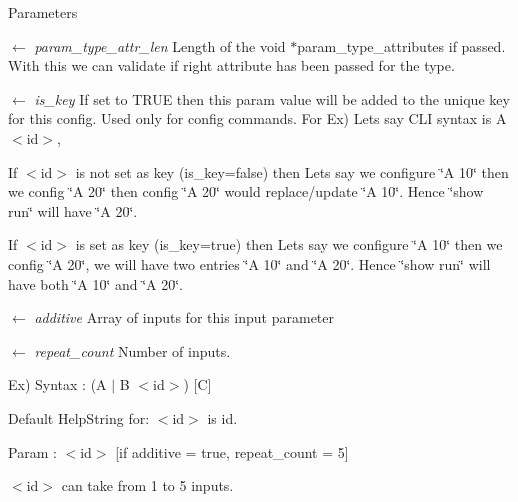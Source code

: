 \begin{DoxyParams}{Parameters}
\item[\mbox{$\leftarrow$} {\em param\_\-type\_\-attr\_\-len}]Length of the void $\ast$param\_\-type\_\-attributes if passed. With this we can validate if right attribute has been passed for the type. \item[\mbox{$\leftarrow$} {\em is\_\-key}]If set to TRUE then this param value will be added to the unique key for this config. Used only for config commands. For Ex) Lets say CLI syntax is A $<$id$>$,
\begin{DoxyItemize}
\item If $<$id$>$ is not set as key (is\_\-key=false) then Lets say we configure \char`\"{}A 10\char`\"{} then we config \char`\"{}A 20\char`\"{} then config \char`\"{}A 20\char`\"{} would replace/update \char`\"{}A 10\char`\"{}. Hence \char`\"{}show run\char`\"{} will have \char`\"{}A 20\char`\"{}.
\item If $<$id$>$ is set as key (is\_\-key=true) then Lets say we configure \char`\"{}A 10\char`\"{} then we config \char`\"{}A 20\char`\"{}, we will have two entries \char`\"{}A 10\char`\"{} and \char`\"{}A 20\char`\"{}. Hence \char`\"{}show run\char`\"{} will have both \char`\"{}A 10\char`\"{} and \char`\"{}A 20\char`\"{}. 
\end{DoxyItemize}\item[\mbox{$\leftarrow$} {\em additive}]Array of inputs for this input parameter \item[\mbox{$\leftarrow$} {\em repeat\_\-count}]Number of inputs. \par
 Ex) Syntax : (A $|$ B $<$id$>$) \mbox{[}C\mbox{]} \par
 Default HelpString for: $<$id$>$ is id. \par
 Param : $<$id$>$ \mbox{[}if additive = true, repeat\_\-count = 5\mbox{]} \par
 $<$id$>$ can take from 1 to 5 inputs. \par
\end{DoxyParams}

